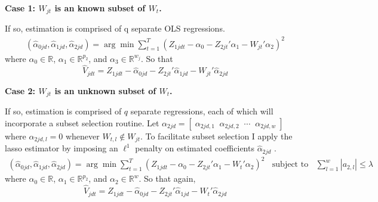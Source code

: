 \documentclass[10pt]{article}
\begin{document}
\noindent \bf Case 1: \rm $W_{jt}$ is an known subset of $W_{t}$.   \

\noindent If so, estimation is comprised of q separate OLS regressions.
\begin{align*}
(\hat{\alpha}_{0jd}, \hat{\alpha}_{1jd},\hat{\alpha}_{2jd})
 = \arg \min \sum_{t=1}^T\left(Z_{1jdt} - \alpha_{0} -  Z_{2jt}'\alpha_{1} - W_{jt}'\alpha_{2} \right)^2
\end{align*}
where $\alpha_0 \in \mathbb{R}$, $\alpha_{1} \in \mathbb{R}^{p_2}$, and $\alpha_{3} \in \mathbb{R}^{w_j}$. So that
$$\hat{V}_{jdt} = Z_{1jdt} - \hat{\alpha}_{0jd} - Z_{2jt}'\hat{\alpha}_{1jd} - W_{jt}'\hat{\alpha}_{2jd}$$

\noindent\bf Case 2: \rm $W_{jt}$ is an unknown subset of $W_{t}$. \

\noindent If so, estimation is comprised of $q$ separate regressions, each of which will incorporate a subset selection routine. Let $\alpha_{2jd} =  [\;\alpha_{2jd,1} \;\; \alpha_{2jd,2} \;\; \cdots \;\; \alpha_{2jd,w} \; ]$ where $\alpha_{2jd,l} = 0$ whenever $W_{t,l} \notin W_{jt}$. To facilitate subset selection I apply the lasso estimator by imposing an $\ell^1$ penalty on estimated coefficients $\hat{\alpha}_{2jd}$ .
%
\begin{align*}
(\hat{\alpha}_{0jd}, \hat{\alpha}_{1jd},\hat{\alpha}_{2jd})  = \arg \min \sum_{t=1}^T\left(Z_{1jdt} - \alpha_{0} -  Z_{2jt}'\alpha_{1} - W_{t}'\alpha_{2} \right)^2 \;\; \text{ subject to } \;\; \sum_{l = 1}^w |a_{2,l}| \leq \lambda
\end{align*}
where $\alpha_0 \in \mathbb{R}$, $\alpha_{1} \in \mathbb{R}^{p_2}$, and $\alpha_{2} \in \mathbb{R}^{w}$. So that again,
 $$\hat{V}_{jdt} = Z_{1jdt} -\hat{\alpha}_{0jd} - Z_{2jt}'\hat{\alpha}_{1jd} - W_{t}'\hat{\alpha}_{2jd}$$
\end{document}
